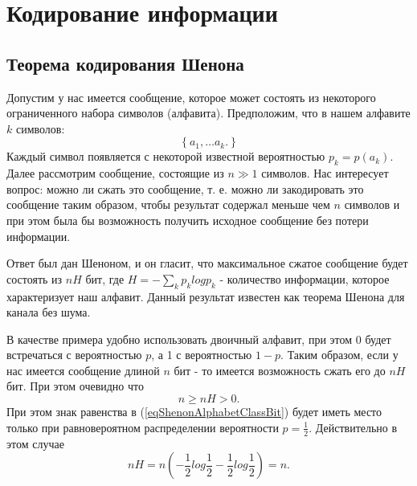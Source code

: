 \section{Кодирование информации}

\subsection{Теорема кодирования Шенона}
Допустим у нас имеется сообщение, которое может состоять из
некоторого ограниченного набора символов (алфавита). Предположим, что
в нашем алфавите $k$ символов:
\begin{equation}
\left\{
a_1, \dots a_k.
\right\}
\label{eqShenonAlphabetClass}
\end{equation}
Каждый символ появляется с некоторой известной вероятностью
$p_k = p\left(a_k\right)$. Далее рассмотрим сообщение, состоящие из $n
\gg 1$ символов. Нас интересует вопрос: можно ли сжать это сообщение,
т. е. можно ли закодировать это сообщение таким образом, чтобы
результат содержал меньше чем $n$ символов и при этом была бы
возможность получить исходное сообщение без потери информации.

Ответ был дан Шеноном, и он гласит, что максимальное сжатое сообщение
будет состоять из $n H$ бит, где $H = - \sum_k p_k log p_k$ -
количество информации, которое характеризует наш алфавит. Данный
результат известен как теорема Шенона для канала без шума.

В качестве примера удобно использовать двоичный алфавит, при этом 0
будет встречаться с вероятностью $p$, а 1 с вероятностью $1 -
p$. Таким образом, если у нас имеется сообщение длиной $n$ бит - то
имеется возможность сжать его до $n H$ бит. При этом очевидно что 
\begin{equation}
n \ge n H > 0.
\label{eqShenonAlphabetClassBit}
\end{equation}
При этом знак равенства в (\ref{eqShenonAlphabetClassBit}) будет иметь
место только при равновероятном распределении вероятности $p =
\frac{1}{2}$. Действительно в этом случае 
\[
n H = n \left(- \frac{1}{2} log \frac{1}{2} - \frac{1}{2} log
  \frac{1}{2}\right) = n.
\]

